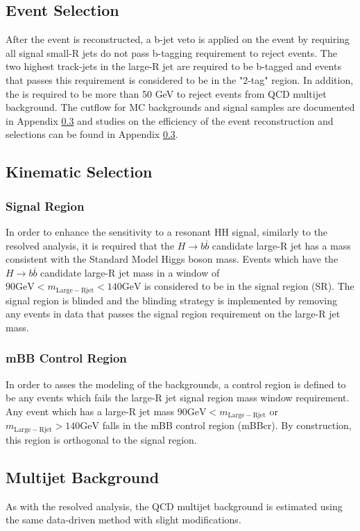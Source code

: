 \subsection{Event Selection}
After the event is reconstructed, a b-jet veto is applied on the event by requiring all signal small-R jets do not pass b-tagging requirement to reject \ttbar events. The two highest \pT track-jets in the large-R jet are required to be b-tagged and events that passes this requirement is considered to be in the "2-tag" region. In addition, the \met is required to be more than 50 GeV to reject events from QCD multijet background. The cutflow for MC backgrounds and signal samples are documented in Appendix \ref{} and studies on the efficiency of the event reconstruction and selections can be found in Appendix \ref{}.

\subsection{Kinematic Selection}
\subsubsection{Signal Region}
In order to enhance the sensitivity to a resonant HH signal, similarly to the resolved analysis, it is required
that the ${H\rightarrow b\overline{b}}$ candidate large-R jet has a mass consistent with the Standard Model Higgs boson mass.
Events which have the ${H\rightarrow b\overline{b}}$ candidate large-R jet mass in a window of ${90 \mathrm{GeV} < m_{\mathrm{Large-R jet}} < 140 \mathrm{GeV}}$ is considered to be in the signal region (SR).
The signal region is blinded and the blinding strategy is implemented by removing any events in data that passes the signal region requirement on the large-R jet mass.

\subsubsection{mBB Control Region}
In order to asses the modeling of the backgrounds, a control region is defined to be any events which fails the large-R jet signal region mass window requirement. Any event which has a large-R jet mass
 ${90 \mathrm{GeV} < m_{\mathrm{Large-R jet}}}$
 or ${m_{\mathrm{Large-R jet}} > 140 \mathrm{GeV}}$ 
 falls in the mBB control region (mBBcr). By construction, this region is orthogonal to the signal region.

\subsection{Multijet Background}
As with the resolved analysis, the QCD multijet background is estimated using the same data-driven method with slight modifications. 
 
